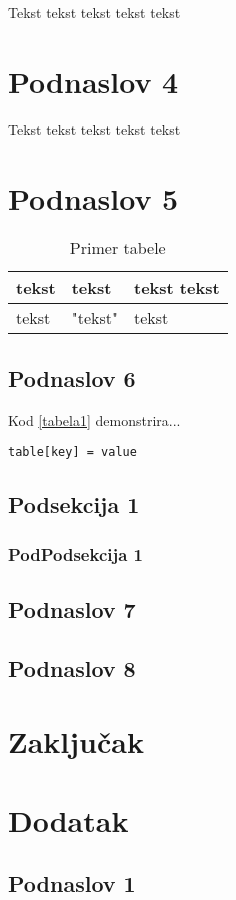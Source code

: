 \documentclass[a4paper]{article}
\begin{document}
Tekst tekst tekst tekst tekst %


\section{Podnaslov 4}
\label{sec:podnaslov4}

Tekst tekst tekst tekst tekst %


\section{Podnaslov 5}
\label{sec:podnaslov5}



\begin{table}[h!]
\begin{center}
\caption{Primer tabele}
\begin{tabular}{|l|l|l|}
\hline
tekst & tekst & tekst tekst \\
\hline
tekst &  "tekst" &  tekst \\
\hline 
\end{tabular}
\label{tabela}
\end{center}
\end{table}

\subsection{Podnaslov 6}
\label{sec:podnaslov6}

Kod \ref{tabela1} demonstrira...

\begin{lstlisting}[caption={Primer koda},frame=single, label=tabela1]
table[key] = value
\end{lstlisting}


\subsection*{Podsekcija 1}


\subsubsection*{PodPodsekcija 1}


\subsection{Podnaslov 7}
\label{sec:podnaslov7}


\subsection{Podnaslov 8}
\label{sec:podnaslov8}


\section{Zaključak}
\label{sec:zakljucak}

\appendix
 


\appendix
\section{Dodatak}
\subsection{Podnaslov 1}
\end{document}
